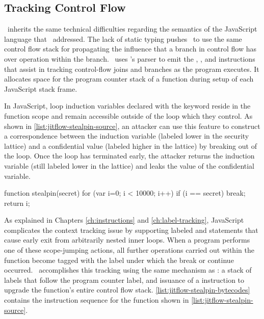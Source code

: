 \subsection{Tracking Control Flow}
\label{sec:jitflow-tracking-controlflow}

\JitFlow\ inherits the same technical difficulties regarding the semantics of the JavaScript language that \FlowCore\ addressed.
The lack of static typing pushes \JitFlow\ to use the same control flow stack for propagating the influence that a branch in control flow has over operation within the branch.
\JitFlow\ uses \FlowCore's parser to emit the \dup, \join, and \popj instructions that assist in tracking control-flow joins and branches as the program executes.
It allocates space for the program counter stack of a function during setup of each JavaScript stack frame.

In JavaScript, loop induction variables declared with the  keyword reside in the function scope and remain accessible outside of the loop which they control.
As shown in \autoref{list:jitflow-stealpin-source}, an attacker can use this feature to construct a correspondence between the induction variable (labeled lower in the security lattice) and a confidential value (labeled higher in the lattice) by breaking out of the loop.
Once the loop has terminated early, the attacker returns the induction variable (still labeled lower in the lattice) and leaks the value of the confidential variable.

\begin{jscode}
function stealpin(secret) {
  for (var i=0; i < 10000; i++) {
    if (i == secret)
      break;
  }
  return i;
}
\end{jscode}

As explained in Chapters \ref{ch:instructions} and \ref{ch:label-tracking}, JavaScript complicates the context tracking issue by supporting labeled  and  statements that cause early exit from arbitrarily nested inner loops.
When a program performs one of these scope-jumping actions, all further operations carried out within the function become tagged with the label under which the break or continue occurred.
\JitFlow\ accomplishes this tracking using the same mechanism as \FlowCore: a stack of labels that follow the program counter label, and issuance of a \popj instruction to upgrade the function's entire control flow stack.
\autoref{list:jitflow-stealpin-bytecodes} contains the instruction sequence for the  function shown in \autoref{list:jitflow-stealpin-source}.

